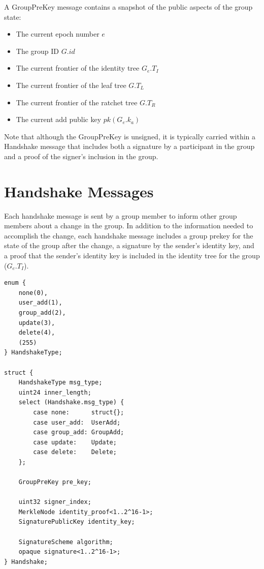 \documentclass[11pt, oneside]{article}
\begin{document}
A GroupPreKey message contains a snapshot of the public aspects of the group state:

\begin{itemize}
\item{The current epoch number $e$}
\item{The group ID $G.id$}
\item{The current frontier of the identity tree $G_e.T_I$}
\item{The current frontier of the leaf tree $G.T_L$}
\item{The current frontier of the ratchet tree $G.T_R$}
\item{The current add public key $pk(G_e.k_a)$}
\end{itemize}

Note that although the GroupPreKey is unsigned, it is typically carried within a Handshake message that includes both a signature by a participant in the group and a proof of the signer's inclusion in the group.


\section{Handshake Messages}

Each handshake message is sent by a group member to inform other group members about a change in the group.  In addition to the information needed to accomplish the change, each handshake message includes a group prekey for the state of the group after the change, a signature by the sender's identity key, and a proof that the sender's identity key is included in the identity tree for the group ($G_e.T_I$).

\begin{verbatim}
enum {
    none(0), 
    user_add(1), 
    group_add(2),
    update(3),
    delete(4),
    (255)
} HandshakeType;

struct {
    HandshakeType msg_type;
    uint24 inner_length;
    select (Handshake.msg_type) {
        case none:      struct{};
        case user_add:  UserAdd;
        case group_add: GroupAdd;
        case update:    Update;
        case delete:    Delete;
    };

    GroupPreKey pre_key;

    uint32 signer_index;
    MerkleNode identity_proof<1..2^16-1>;
    SignaturePublicKey identity_key;

    SignatureScheme algorithm;
    opaque signature<1..2^16-1>;
} Handshake;
\end{verbatim}
\end{document}
